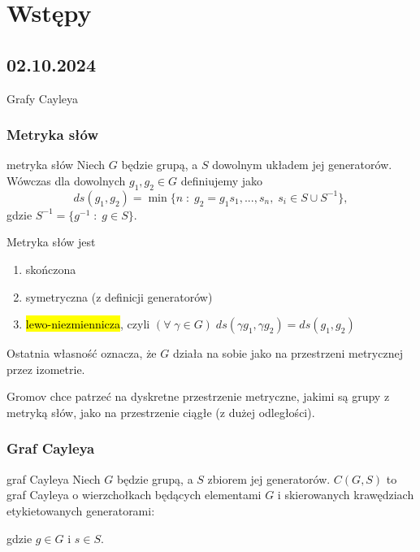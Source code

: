 \chapter{Wstępy}

\section{02.10.2024}{Grafy Cayleya}

\subsection{Metryka słów}

\begin{definition}{metryka słów}{}
  Niech $G$ będzie grupą, a $S$ dowolnym układem jej generatorów. Wówczas dla dowolnych $g_1,g_2\in G$  definiujemy jako
$$ds(g_1, g_2)=\min\{n\;:\;g_2=g_1s_1,...,s_n,\;s_i\in S\cup S^{-1}\},$$
gdzie $S^{-1}=\{g^{-1}\;:\;g\in S\}$.
\end{definition}

Metryka słów jest 
\begin{enumerate}
  \item skończona
  \item symetryczna (z definicji generatorów)
  \item \hl{lewo-niezmiennicza}, czyli $(\forall\;\gamma\in G)\;ds(\gamma g_1,\gamma g_2)=ds(g_1, g_2)$
\end{enumerate}
Ostatnia własność oznacza, że $G$ działa na sobie jako na przestrzeni metrycznej przez izometrie.

Gromov chce patrzeć na dyskretne przestrzenie metryczne, jakimi są grupy z metryką słów, jako na przestrzenie ciągłe (z dużej odległości).

\subsection{Graf Cayleya}

\begin{definition}{graf Cayleya}{}
Niech $G$ będzie grupą, a $S$ zbiorem jej generatorów. $C(G, S)$ to graf Cayleya o wierzchołkach będących elementami $G$ i skierowanych krawędziach etykietowanych generatorami:
\begin{center}
\end{center}
gdzie $g\in G$ i $s\in S$.
\end{definition}

